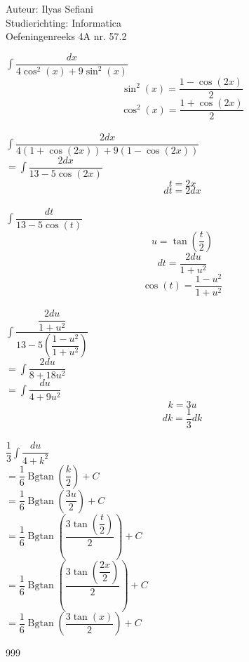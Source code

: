 \documentclass[a4paper]{article}
\begin{document}
\noindent \large Auteur: Ilyas Sefiani \\
\noindent \large Studierichting: Informatica\\
\noindent \large Oefeningenreeks 4A nr. 57.2\\

\medskip

\normalsize

$\displaystyle\int \dfrac{dx}{4\cos^2(x)+9\sin^2(x)}$\\

$$\sin^2(x)=\dfrac{1-\cos(2x)}{2}$$ $$\cos^2(x)=\dfrac{1+\cos(2x)}{2}$$\\

$\displaystyle\int \dfrac{2dx}{4(1+\cos(2x))+9(1-\cos(2x))}$\\

$=\displaystyle\int \dfrac{2dx}{13-5\cos(2x)}$\\

$$t=2x$$ $$dt=2dx$$\\

$\displaystyle\int \dfrac{dt}{13-5\cos(t)}$\\

$$u=\tan\left(\dfrac{t}{2}\right)$$ $$dt=\dfrac{2du}{1+u^2}$$ $$\cos(t)=\dfrac{1-u^2}{1+u^2}$$\\

$\displaystyle\int \dfrac{\dfrac{2du}{1+u^2}}{13-5\left(\dfrac{1-u^2}{1+u^2}\right)}$\\

$=\displaystyle\int \dfrac{2du}{8+18u^2}$\\

$=\displaystyle\int \dfrac{du}{4+9u^2}$\\

$$k=3u$$ $$dk=\dfrac{1}{3}dk$$\\

$\dfrac{1}{3}\displaystyle\int \dfrac{du}{4+k^2}$\\

$=\dfrac{1}{6}\operatorname{Bgtan}{\left(\dfrac{k}{2}\right)} + C$\\

$=\dfrac{1}{6}\operatorname{Bgtan}{\left(\dfrac{3u}{2}\right)} + C$\\

$=\dfrac{1}{6}\operatorname{Bgtan}{\left(\dfrac{3\tan\left(\dfrac{t}{2}\right)}{2}\right)} + C$\\

$=\dfrac{1}{6}\operatorname{Bgtan}{\left(\dfrac{3\tan\left(\dfrac{2x}{2}\right)}{2}\right)} + C$\\

$=\dfrac{1}{6}\operatorname{Bgtan}{\left(\dfrac{3\tan(x)}{2}\right)} + C$\\


\begin{thebibliography}{999}
\end{thebibliography}
\end{document}
